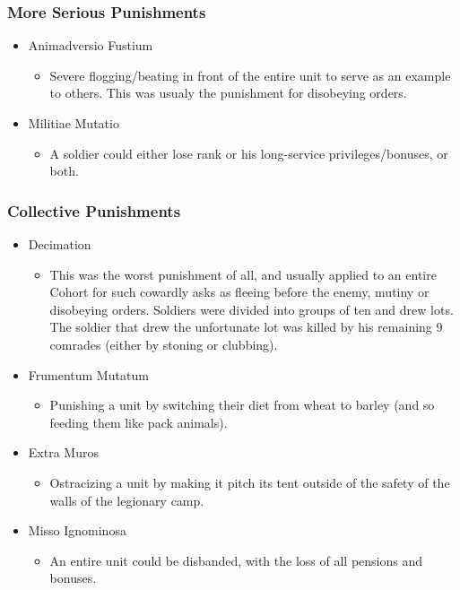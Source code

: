 \documentclass[12pt, twoside]{article}
\begin{document}
\subsubsection{More Serious Punishments}
\begin{itemize}
\item Animadversio Fustium
	\begin{itemize}
	\item Severe flogging/beating in front of the entire  unit to serve as an example to others. This was usualy the punishment for disobeying orders.
	\end{itemize}
\item Militiae Mutatio
	\begin{itemize}
	\item A soldier could either lose rank or his long-service privileges/bonuses, or both.
	\end{itemize}
\end{itemize}

\subsubsection{Collective Punishments}
\begin{itemize}
\item Decimation
	\begin{itemize}
	\item This was the worst punishment of all, and usually applied to an entire Cohort for such cowardly asks as fleeing before the enemy, mutiny or disobeying orders. Soldiers were divided into groups of ten and drew lots. The soldier that drew the unfortunate lot was killed by his remaining 9 comrades (either by stoning or clubbing). 
	\end{itemize}
\item Frumentum Mutatum
	\begin{itemize}
	\item Punishing a unit by switching their diet from wheat to barley (and so feeding them like pack animals).
	\end{itemize}
\item Extra Muros
	\begin{itemize}
	\item Ostracizing a unit by making it pitch its tent outside of the safety of the walls of the legionary camp.
	\end{itemize}
\item Misso Ignominosa
	\begin{itemize}
	\item An entire unit could be disbanded, with the loss of all pensions and bonuses.
	\end{itemize}
\end{itemize}
\end{document}

